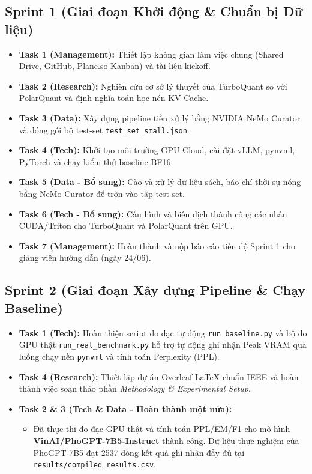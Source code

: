 \documentclass[a4paper,12pt]{article}
\begin{document}
\subsection{Sprint 1 (Giai đoạn Khởi động \& Chuẩn bị Dữ liệu)}
\begin{itemize}[label=\checkmark]
    \item \textbf{Task 1 (Management):} Thiết lập không gian làm việc chung (Shared Drive, GitHub, Plane.so Kanban) và tài liệu kickoff.
    \item \textbf{Task 2 (Research):} Nghiên cứu cơ sở lý thuyết của TurboQuant so với PolarQuant và định nghĩa toán học nén KV Cache.
    \item \textbf{Task 3 (Data):} Xây dựng pipeline tiền xử lý bằng NVIDIA NeMo Curator và đóng gói bộ test-set \texttt{test\_set\_small.json}.
    \item \textbf{Task 4 (Tech):} Khởi tạo môi trường GPU Cloud, cài đặt vLLM, pynvml, PyTorch và chạy kiểm thử baseline BF16.
    \item \textbf{Task 5 (Data - Bổ sung):} Cào và xử lý dữ liệu sách, báo chí thời sự nóng bằng NeMo Curator để trộn vào tập test-set.
    \item \textbf{Task 6 (Tech - Bổ sung):} Cấu hình và biên dịch thành công các nhân CUDA/Triton cho TurboQuant và PolarQuant trên GPU.
    \item \textbf{Task 7 (Management):} Hoàn thành và nộp báo cáo tiến độ Sprint 1 cho giảng viên hướng dẫn (ngày 24/06).
\end{itemize}

\subsection{Sprint 2 (Giai đoạn Xây dựng Pipeline \& Chạy Baseline)}
\begin{itemize}[label=\checkmark]
    \item \textbf{Task 1 (Tech):} Hoàn thiện script đo đạc tự động \texttt{run\_baseline.py} và bộ đo GPU thật \texttt{run\_real\_benchmark.py} hỗ trợ tự động ghi nhận Peak VRAM qua luồng chạy nền \texttt{pynvml} và tính toán Perplexity (PPL).
    \item \textbf{Task 4 (Research):} Thiết lập dự án Overleaf LaTeX chuẩn IEEE và hoàn thành việc soạn thảo phần \textit{Methodology \& Experimental Setup}.
    \item \textbf{Task 2 \& 3 (Tech \& Data - Hoàn thành một nửa):}
    \begin{itemize}
        \item Đã thực thi đo đạc GPU thật và tính toán PPL/EM/F1 cho mô hình \textbf{VinAI/PhoGPT-7B5-Instruct} thành công. Dữ liệu thực nghiệm của PhoGPT-7B5 đạt 2537 dòng kết quả ghi nhận đầy đủ tại \texttt{results/compiled\_results.csv}.
    \end{itemize}
\end{itemize}
\end{document}

